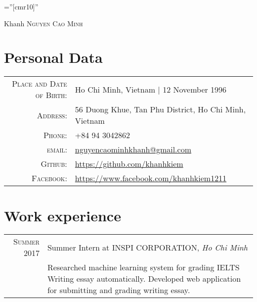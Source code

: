 \documentclass[a4paper,10pt]{article}
\begin{document}

\pagestyle{empty} %

\font\fb=''[cmr10]'' %

\par{\centering
	{\Huge Khanh \textsc{Nguyen Cao Minh}
	}\bigskip\par}

\section{Personal Data}

\begin{tabular}{rl}
	\textsc{Place and Date of Birth:} & Ho Chi Minh, Vietnam | 12 November 1996                                               \\
	\textsc{Address:}                 & 56 Duong Khue, Tan Phu District, Ho Chi Minh, Vietnam                                 \\
	\textsc{Phone:}                   & +84 94 3042862                                                                        \\
	\textsc{email:}                   & \href{mailto:nguyencaominhkhanh@gmail.com}{nguyencaominhkhanh@gmail.com}              \\
	\textsc{Github:}                  & \href{https://github.com/khanhkiem}{https://github.com/khanhkiem}                     \\
	\textsc{Facebook:}                & \href{https://www.facebook.com/khanhkiem1211}{https://www.facebook.com/khanhkiem1211} \\
\end{tabular}

\section{Work experience}
\begin{tabular}{r|p{11cm}}
	\textsc{Summer 2017} & Summer Intern at \textsc{INSPI CORPORATION}, \emph{Ho Chi Minh}\\&\footnotesize{Researched machine learning system for grading IELTS Writing essay automatically. Developed web application for submitting and grading writing essay.}\\
\end{tabular}
\end{document}
